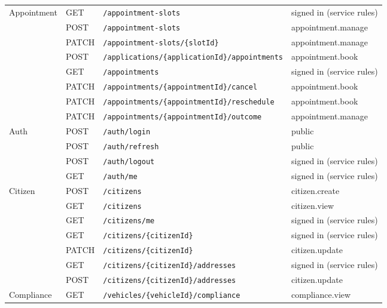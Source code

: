 \begin{longtable}{@{}p{2.1cm}l p{6.6cm} p{3.2cm}@{}}
Appointment & GET & \texttt{/\allowbreak{}appointment-slots} & signed in (service rules) \\
 & POST & \texttt{/\allowbreak{}appointment-slots} & appointment.manage \\
 & PATCH & \texttt{/\allowbreak{}appointment-slots/\allowbreak{}\{slotId\}} & appointment.manage \\
 & POST & \texttt{/\allowbreak{}applications/\allowbreak{}\{applicationId\}/\allowbreak{}appointments} & appointment.book \\
 & GET & \texttt{/\allowbreak{}appointments} & signed in (service rules) \\
 & PATCH & \texttt{/\allowbreak{}appointments/\allowbreak{}\{appointmentId\}/\allowbreak{}cancel} & appointment.book \\
 & PATCH & \texttt{/\allowbreak{}appointments/\allowbreak{}\{appointmentId\}/\allowbreak{}reschedule} & appointment.book \\
 & PATCH & \texttt{/\allowbreak{}appointments/\allowbreak{}\{appointmentId\}/\allowbreak{}outcome} & appointment.manage \\
Auth & POST & \texttt{/\allowbreak{}auth/\allowbreak{}login} & public \\
 & POST & \texttt{/\allowbreak{}auth/\allowbreak{}refresh} & public \\
 & POST & \texttt{/\allowbreak{}auth/\allowbreak{}logout} & signed in (service rules) \\
 & GET & \texttt{/\allowbreak{}auth/\allowbreak{}me} & signed in (service rules) \\
Citizen & POST & \texttt{/\allowbreak{}citizens} & citizen.create \\
 & GET & \texttt{/\allowbreak{}citizens} & citizen.view \\
 & GET & \texttt{/\allowbreak{}citizens/\allowbreak{}me} & signed in (service rules) \\
 & GET & \texttt{/\allowbreak{}citizens/\allowbreak{}\{citizenId\}} & signed in (service rules) \\
 & PATCH & \texttt{/\allowbreak{}citizens/\allowbreak{}\{citizenId\}} & citizen.update \\
 & GET & \texttt{/\allowbreak{}citizens/\allowbreak{}\{citizenId\}/\allowbreak{}addresses} & signed in (service rules) \\
 & POST & \texttt{/\allowbreak{}citizens/\allowbreak{}\{citizenId\}/\allowbreak{}addresses} & citizen.update \\
Compliance & GET & \texttt{/\allowbreak{}vehicles/\allowbreak{}\{vehicleId\}/\allowbreak{}compliance} & compliance.view \\

\end{longtable}
